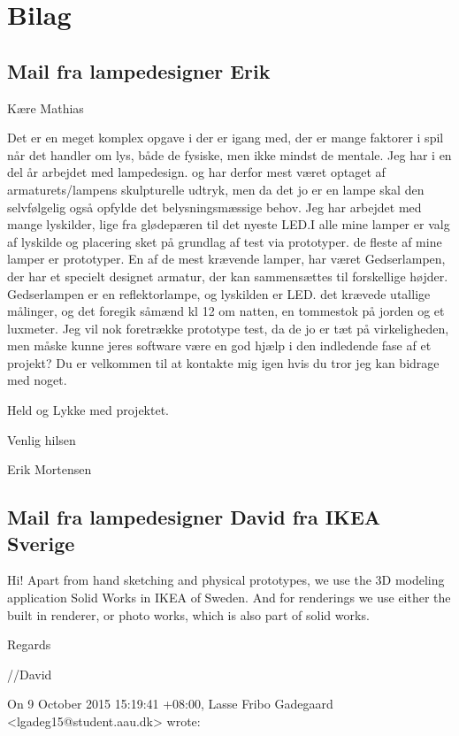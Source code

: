 \section*{Bilag}
\renewcommand{\thesubsection}{\Alph{subsection}}

\subsection{Mail fra lampedesigner Erik}
\label{sec:mailErik}
Kære Mathias

Det er en meget komplex opgave i der er igang med, der er mange faktorer i spil når det handler om lys, både de fysiske, men ikke mindst de mentale. Jeg har i en del år arbejdet med lampedesign. og har derfor mest været optaget af armaturets/lampens skulpturelle udtryk, men da det jo er en lampe skal den selvfølgelig  også opfylde det belysningsmæssige behov. Jeg har arbejdet med mange lyskilder, lige fra glødepæren til det nyeste LED.I alle mine lamper er valg af lyskilde og placering sket på grundlag af test via prototyper. de fleste af mine lamper er prototyper. En af de mest krævende lamper, har været Gedserlampen, der har et specielt designet armatur, der kan sammensættes til forskellige højder. Gedserlampen er en reflektorlampe, og lyskilden er LED. det krævede utallige målinger, og det foregik såmænd kl 12 om natten, en tommestok på jorden og et luxmeter. Jeg vil nok foretrække prototype test, da de jo er tæt på virkeligheden, men måske kunne jeres software være en god hjælp i den indledende fase af et projekt? Du er velkommen til at kontakte mig igen hvis du tror jeg kan bidrage med noget.

Held og Lykke med projektet.

Venlig hilsen

Erik Mortensen

\subsection{Mail fra lampedesigner David fra IKEA Sverige}
\label{sec:mailDavid}
Hi! Apart from hand sketching and physical prototypes, we use the 3D modeling application Solid Works in IKEA of Sweden. And for renderings we use either the built in renderer, or photo works, which is also part of solid works.

Regards 

//David 

  On 9 October 2015 15:19:41 +08:00, Lasse Fribo Gadegaard <lgadeg15@student.aau.dk> wrote:
   
